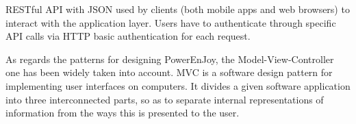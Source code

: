 RESTful API with JSON used by clients (both mobile apps and web browsers) to interact with the application layer. Users have to authenticate through specific API calls via HTTP basic authentication for each request.

As regards the patterns for designing PowerEnJoy, the Model-View-Controller one has been widely taken into account. MVC is a software design pattern for implementing user interfaces on computers. It divides a given software application into three interconnected parts, so as to separate internal representations of information from the ways this is presented to the user.
